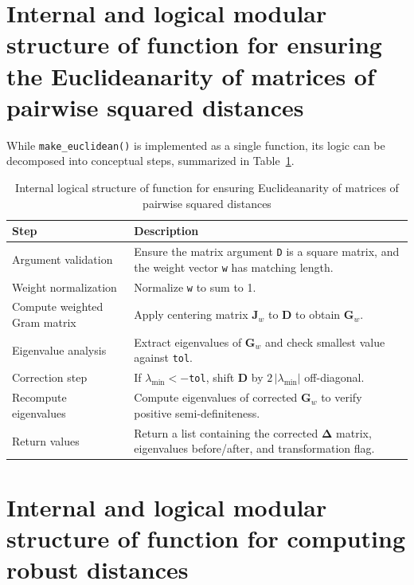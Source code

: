 \section{Internal and logical modular structure of function for ensuring the Euclideanarity of matrices of pairwise squared distances}
\label{AppMakeEuclidean}

While \texttt{make\_euclidean()} is implemented as a single function, its logic can be decomposed into conceptual steps, summarized in Table~\ref{tab:modular-structure-euclidean}.

\begin{table}[h!]
\caption{Internal logical structure of function for ensuring Euclideanarity of matrices of pairwise squared distances}
\label{tab:modular-structure-euclidean}
\begin{center}
{\footnotesize
\begin{tabular}{|p{3.5cm}p{10.2cm}|}
\hline
\textbf{Step} & \textbf{Description} \\
\hline
Argument validation & Ensure the matrix argument \texttt{D} is a square matrix, and the weight vector \texttt{w} has matching length. \\
\hline
Weight normalization & Normalize \texttt{w} to sum to 1. \\
\hline
Compute weighted Gram matrix & Apply centering matrix $\mathbf{J}_w$ to $\mathbf{D}$ to obtain $\mathbf{G}_w$. \\
\hline
Eigenvalue analysis & Extract eigenvalues of $\mathbf{G}_w$ and check smallest value against \texttt{tol}. \\
\hline
Correction step & If $\lambda_{\min} < -$\verb+tol+, %
shift $\mathbf{D}$ by $2\,|\lambda_{\min}|$ off-diagonal. \\
\hline
Recompute eigenvalues & Compute eigenvalues of corrected $\mathbf{G}_w$ to verify positive semi-definiteness. \\
\hline
Return values & Return a list containing the corrected $\mathbf{\Delta}$ matrix, eigenvalues before/after, and transformation flag. \\
\hline
\end{tabular}}
\end{center}
\end{table}

\section{Internal and logical modular structure of function for computing robust distances}
\label{AppRobustDistances}

